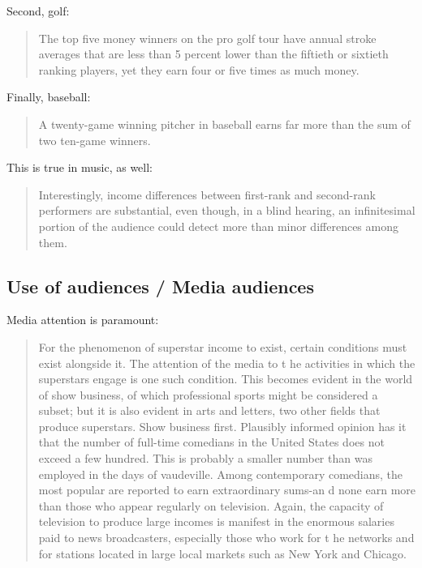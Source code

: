 \documentclass[]{book}
\theoremstyle{definition}
\theoremstyle{definition}
\theoremstyle{definition}
\theoremstyle{remark}
\begin{document}
Second, golf:

\begin{quote}
The top five money winners on the pro golf tour have annual stroke
averages that are less than 5 percent lower than the fiftieth or
sixtieth ranking players, yet they earn four or five times as much
money.
\end{quote}

Finally, baseball:

\begin{quote}
A twenty-game winning pitcher in baseball earns far more than the sum of
two ten-game winners.
\end{quote}

This is true in music, as well:

\begin{quote}
Interestingly, income differences between first-rank and second-rank
performers are substantial, even though, in a blind hearing, an
infinitesimal portion of the audience could detect more than minor
differences among them.
\end{quote}

\subsection{Use of audiences / Media
audiences}\label{use-of-audiences-media-audiences}

Media attention is paramount:

\begin{quote}
For the phenomenon of superstar income to exist, certain conditions must
exist alongside it. The attention of the media to t he activities in
which the superstars engage is one such condition. This becomes evident
in the world of show business, of which professional sports might be
considered a subset; but it is also evident in arts and letters, two
other fields that produce superstars. Show business first. Plausibly
informed opinion has it that the number of full-time comedians in the
United States does not exceed a few hundred. This is probably a smaller
number than was employed in the days of vaudeville. Among contemporary
comedians, the most popular are reported to earn extraordinary sums-an d
none earn more than those who appear regularly on television. Again, the
capacity of television to produce large incomes is manifest in the
enormous salaries paid to news broadcasters, especially those who work
for t he networks and for stations located in large local markets such
as New York and Chicago.
\end{quote}
\end{document}
